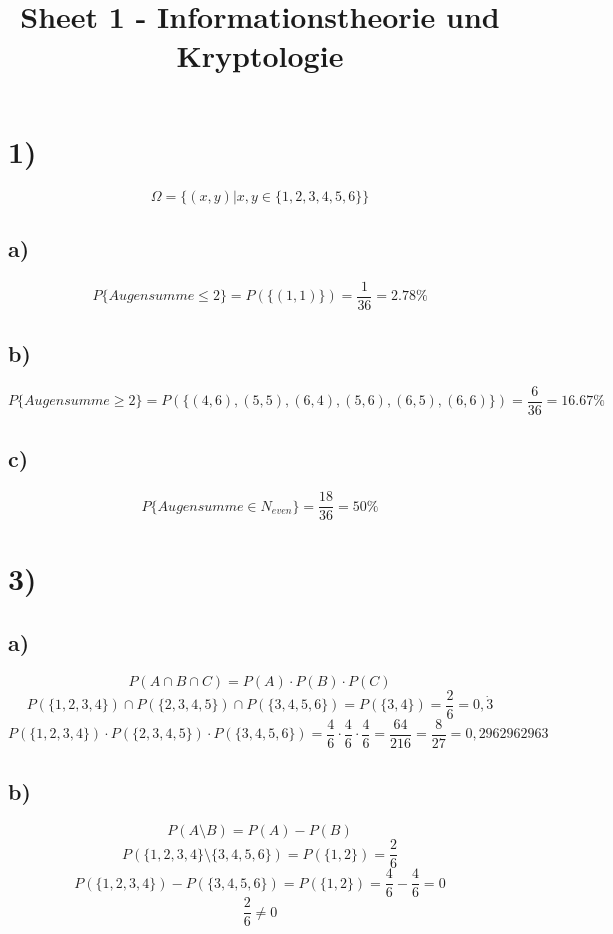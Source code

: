 \documentclass{article}
\begin{document}
  \title{Sheet 1 - Informationstheorie und Kryptologie}
  \date{}
  \author{}

  \maketitle

\section*{1)}
  \[ \Omega = \{(x,y) |x,y \in \{ 1,2,3,4,5,6 \} \} \]

  \subsection*{a)}
    \[ P \{ Augensumme \leq 2 \} = P(\{ (1,1)\} ) = \frac{1}{36} = 2.78\% \]

  \subsection*{b)}
    \[ P \{ Augensumme \geq 2 \} = P(\{ (4,6), (5,5), (6,4), (5,6), (6,5), (6,6)\} ) = \frac{6}{36} = 16.67\% \]

  \subsection*{c)}
    \[ P \{ Augensumme \in N_{even} \} = \frac{18}{36} = 50\% \]

\section*{3)}

  \subsection*{a)}
    \[ P(A \cap B \cap C) = P(A) \cdot P(B) \cdot P(C) \]
    \[ P(\{1, 2, 3, 4\}) \cap P(\{2, 3, 4, 5\}) \cap P(\{3, 4, 5, 6\}) = P(\{3, 4\}) = \frac{2}{6} = 0,\dot{3} \]
    \[ P(\{1, 2, 3, 4\}) \cdot P(\{2, 3, 4, 5\}) \cdot P(\{3, 4, 5, 6\}) = \frac{4}{6} \cdot \frac{4}{6} \cdot \frac{4}{6} = \frac{64}{216} = \frac{8}{27} = 0,2962962963 \]

  \subsection*{b)}
    \[ P(A \setminus B) = P(A) - P(B) \]
    \[ P(\{1, 2, 3, 4\} \setminus \{3, 4, 5, 6\}) = P(\{1, 2\}) = \frac{2}{6} \]
    \[ P(\{1, 2, 3, 4\}) - P(\{3, 4, 5, 6\}) = P(\{1, 2\}) = \frac{4}{6} - \frac{4}{6} = 0 \]
    \[ \frac{2}{6} \neq 0 \]
\end{document}
